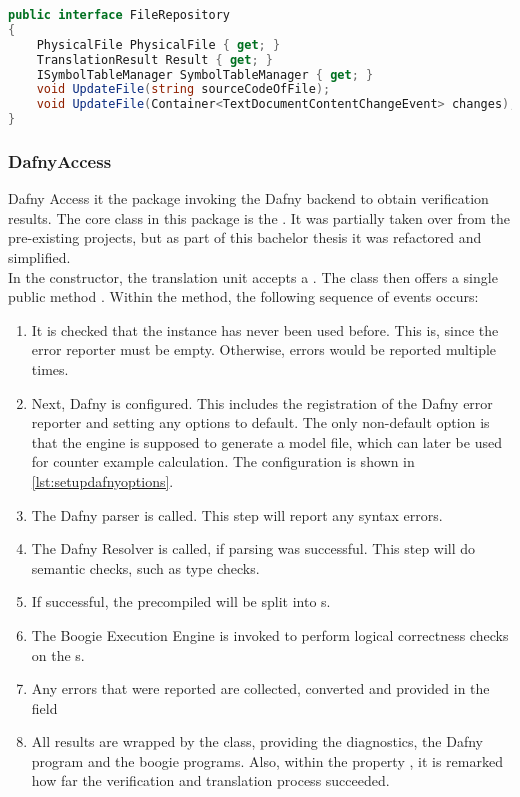 \begin{lstlisting}[language=csharp, caption={Handling Compilation}, captionpos=b, label={lst:handlecompilation}]
public interface FileRepository
{
    PhysicalFile PhysicalFile { get; }
    TranslationResult Result { get; }
    ISymbolTableManager SymbolTableManager { get; }
    void UpdateFile(string sourceCodeOfFile);
    void UpdateFile(Container<TextDocumentContentChangeEvent> changes);
}
\end{lstlisting}


\subsubsection{DafnyAccess}
Dafny Access it the package invoking the Dafny backend to obtain verification results.
The core class in this package is the .
It was partially taken over from the pre-existing projects, but as part of this bachelor thesis it was refactored and simplified.\\

In the constructor, the translation unit accepts a .
The class then offers a single public method .
Within the method, the following sequence of events occurs:
\begin{enumerate}
    \item It is checked that the instance has never been used before.
    This is, since the error reporter must be empty.
    Otherwise, errors would be reported multiple times.
    \item Next, Dafny is configured.
    This includes the registration of the Dafny error reporter and setting any options to default.
    The only non-default option is that the engine is supposed to generate a model file, which can later be used for counter example calculation.
    The configuration is shown in \ref{lst:setupdafnyoptions}.
    \item The Dafny parser is called.
    This step will report any syntax errors.
    \item The Dafny Resolver is called, if parsing was successful.
    This step will do semantic checks, such as type checks.
    \item If successful, the precompiled  will be split into s.
    \item The Boogie Execution Engine is invoked to perform logical correctness checks on the s.
    \item Any errors that were reported are collected, converted and provided in the field 
    \item All results are wrapped by the  class, providing the diagnostics, the Dafny program and the boogie programs.
    Also, within the property , it is remarked how far the verification and translation process succeeded.
\end{enumerate}

